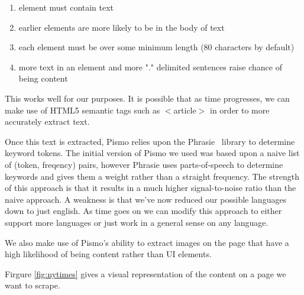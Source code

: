 \documentclass[11pt,letterpaper,titlepage]{article}
\begin{document}
\begin{enumerate}
 \item element must contain text
 \item earlier elements are more likely to be in the body of text
 \item each element must be over some minimum length (80 characters by default)
 \item more text in an element and more "." delimited sentences raise chance of
being content
\end{enumerate}

This works well for our purposes.  It is possible that as time progresses, we
can make use of HTML5 semantic tags such as $<$article$>$ in order to more
accurately extract text.

Once this text is extracted, Pismo relies upon the
Phrasie~\cite{phrasie} library to determine keyword tokens.
The initial version of Pismo we used was based upon a naive list of (token,
freqency) pairs, however Phrasie uses parts-of-speech to determine keywords and
gives them a weight rather than a straight frequency.  The strength of this
approach is that it results in a much higher signal-to-noise ratio than the
naive approach.  A weakness is that we've now reduced our possible languages
down to just english.  As time goes on we can modify this approach to either
support more languages or just work in a general sense on any language.

We also make use of Pismo's ability to extract images on the page that have a
high likelihood of being content rather than UI elements.

Firgure \ref{fig:nytimes} gives a visual representation of the content on a page
we want to scrape.
\end{document}

